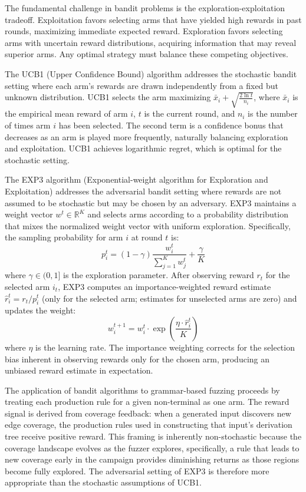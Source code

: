 The fundamental challenge in bandit problems is the exploration-exploitation tradeoff. Exploitation favors selecting arms that have yielded high rewards in past rounds, maximizing immediate expected reward. Exploration favors selecting arms with uncertain reward distributions, acquiring information that may reveal superior arms. Any optimal strategy must balance these competing objectives.

The UCB1 (Upper Confidence Bound) algorithm addresses the stochastic bandit setting where each arm's rewards are drawn independently from a fixed but unknown distribution. UCB1 selects the arm maximizing $\bar{x}_i + \sqrt{\frac{2 \ln t}{n_i}}$, where $\bar{x}_i$ is the empirical mean reward of arm $i$, $t$ is the current round, and $n_i$ is the number of times arm $i$ has been selected. The second term is a confidence bonus that decreases as an arm is played more frequently, naturally balancing exploration and exploitation. UCB1 achieves logarithmic regret, which is optimal for the stochastic setting.

The EXP3 algorithm (Exponential-weight algorithm for Exploration and Exploitation) \cite{exp3} addresses the adversarial bandit setting where rewards are not assumed to be stochastic but may be chosen by an adversary. EXP3 maintains a weight vector $w^t \in \mathbb{R}^K$ and selects arms according to a probability distribution that mixes the normalized weight vector with uniform exploration. Specifically, the sampling probability for arm $i$ at round $t$ is:
\begin{equation}
p_i^t = (1 - \gamma) \frac{w_i^t}{\sum_{j=1}^K w_j^t} + \frac{\gamma}{K}
\end{equation}
where $\gamma \in (0, 1]$ is the exploration parameter. After observing reward $r_t$ for the selected arm $i_t$, EXP3 computes an importance-weighted reward estimate $\hat{r}_i^t = r_t / p_i^t$ (only for the selected arm; estimates for unselected arms are zero) and updates the weight:
\begin{equation}
w_i^{t+1} = w_i^t \cdot \exp\left(\frac{\eta \cdot \hat{r}_i^t}{K}\right)
\end{equation}
where $\eta$ is the learning rate. The importance weighting corrects for the selection bias inherent in observing rewards only for the chosen arm, producing an unbiased reward estimate in expectation.

The application of bandit algorithms to grammar-based fuzzing proceeds by treating each production rule for a given non-terminal as one arm. The reward signal is derived from coverage feedback: when a generated input discovers new edge coverage, the production rules used in constructing that input's derivation tree receive positive reward. This framing is inherently non-stochastic because the coverage landscape evolves as the fuzzer explores, specifically, a rule that leads to new coverage early in the campaign provides diminishing returns as those regions become fully explored. The adversarial setting of EXP3 is therefore more appropriate than the stochastic assumptions of UCB1.

